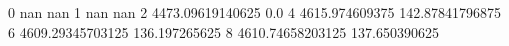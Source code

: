 0 nan nan
1 nan nan
2 4473.09619140625 0.0
4 4615.974609375 142.87841796875
6 4609.29345703125 136.197265625
8 4610.74658203125 137.650390625
